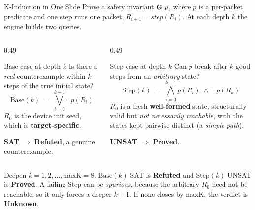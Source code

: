 \begin{frame}{K-Induction in One Slide}
  Prove a safety invariant \(\mathop{\mathbf{G}}\, p\), where \(p\) is a per-packet
  predicate and one step runs one packet, \(R_{i+1} = \mathit{step}(R_i)\). At
  each depth \(k\) the engine builds two queries.

  \vspace{0.7em}
  \begin{columns}[T,onlytextwidth]
    \begin{column}{0.49\textwidth}
      \begin{block}{Base case at depth \(k\)}
        \small
        Is there a \emph{real} counterexample within \(k\) steps of the true
        initial state?
        \[
          \mathrm{Base}(k)\;=\;\bigvee_{i=0}^{k-1} \lnot p(R_i)
        \]
        \(R_0\) is the device init seed, which is \textbf{target-specific}.
        \par\vspace{0.4em}
        \textcolor{palCoral!75!black}{\textbf{SAT}} \(\Rightarrow\)
        \textbf{Refuted}, a genuine counterexample.
      \end{block}
    \end{column}

    \begin{column}{0.49\textwidth}
      \begin{block}{Step case at depth \(k\)}
        \small
        Can \(p\) break after \(k\) good steps from an \emph{arbitrary} state?
        \[
          \mathrm{Step}(k)\;=\;\bigwedge_{i=0}^{k-1} p(R_i)\;\wedge\;\lnot p(R_k)
        \]
        \(R_0\) is a fresh \textbf{well-formed} state, structurally valid but
        \emph{not necessarily reachable}, with the states kept pairwise distinct
        (a \emph{simple path}).
        \par\vspace{0.4em}
        \textcolor{palOlivine!60!black}{\textbf{UNSAT}} \(\Rightarrow\)
        \textbf{Proved}.
      \end{block}
    \end{column}
  \end{columns}

  \vspace{0.6em}
  \footnotesize
  Deepen \(k = 1, 2, \dots, \text{maxK} = 8\). \(\mathrm{Base}(k)\) SAT is
  \textbf{Refuted} and \(\mathrm{Step}(k)\) UNSAT is \textbf{Proved}. A failing
  \(\mathrm{Step}\) can be \emph{spurious}, because the arbitrary \(R_0\) need
  not be reachable, so it only forces a deeper \(k+1\). If none closes by
  \(\text{maxK}\), the verdict is \textbf{Unknown}.
\end{frame}



